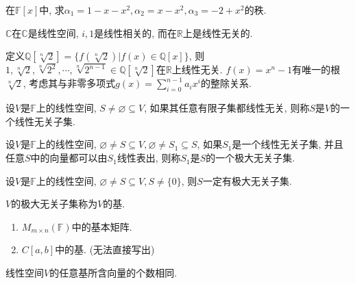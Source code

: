 \begin{example}
    在$\mathbb{F}[x]$中, 求$\alpha{_1}=1-x-x^2, \alpha{_2}=x-x^2, \alpha{_3}=-2+x^2$的秩.
\end{example}

\begin{example}
    $\mathbb{C}$在$\mathbb{C}$是线性空间, $i, 1$是线性相关的, 而在$\mathbb{R}$上是线性无关的.
\end{example}

\begin{example}
    定义$\mathbb{Q}[\sqrt[n]{2}]=\{f(\sqrt[n]{2})|f(x)\in \mathbb{Q}[x]\}$, 则$1, \sqrt[n]{2}, \sqrt[n]{2^2}, \cdots, \sqrt[n]{2^{n-1}} \in \mathbb{Q}[\sqrt[n]{2}]$在$\mathbb{R}$上线性无关.
    $f(x)=x^n-1$有唯一的根$\sqrt[n]{2}$, 考虑其与非零多项式$g(x)=\sum^{n-1}_{i=0}a_ix^i$的整除关系.
\end{example}

\begin{definition}[线性无关子集]
    设$V$是$\mathbb{F}$上的线性空间, $S \ne \varnothing \subseteq V$, 如果其任意有限子集都线性无关, 则称$S$是$V$的一个线性无关子集.
\end{definition}

\begin{definition}[极大线性无关子集]
    设$V$是$\mathbb{F}$上的线性空间, $\varnothing \ne S \subseteq V, \varnothing \ne S_1 \subseteq S$, 如果$S_1$是一个线性无关子集, 并且任意$S$中的向量都可以由$S_1$线性表出, 则称$S_1$是$S$的一个极大无关子集.
\end{definition}

\begin{axiom}[基的存在性定理]
    设$V$是$\mathbb{F}$上的线性空间, $\varnothing \ne S \subseteq V, S \ne \{0\}$, 则$S$一定有极大无关子集.
\end{axiom}

\begin{definition}[基]
    $V$的极大无关子集称为$V$的基.
\end{definition}

\begin{example}
    \par
    \begin{enumerate}[itemindent=1em]
        \item $M_{m\times n}(\mathbb{F})$中的基本矩阵.
        \item $C[a, b]$中的基. (无法直接写出)
    \end{enumerate}
\end{example}

\begin{lemma}
    线性空间$V$的任意基所含向量的个数相同.
\end{lemma}

